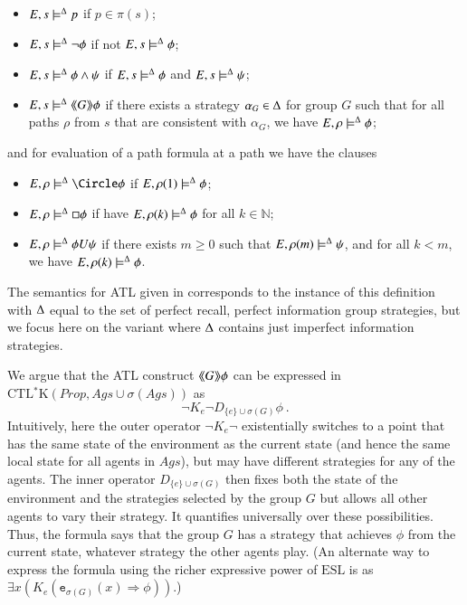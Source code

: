 \documentclass[a4wide]{article}
\newcommand{\CTLsK}{\mbox{CTL$^*$K}}
\newcommand{\ESL}{\mbox{ESL}}
\newcommand{\until}{U}
\newcommand{\Prop}{Prop}
\newcommand{\nat}{\mathbb{N}}
\theoremstyle{examplesty}
\newcommand{\strat}{\sigma}
\newcommand{\Ags}{\mathit{Ags}}
\newcommand{\atlop}[1]{\langle\hspace{-2pt}\langle #1 \rangle \hspace{-2pt}\rangle }
\newcommand{\lid}[2]{\mathtt{e}_{#1}(#2)}
\newcommand{\rimp}{\Rightarrow}
\newcommand{\Env}{E}
\newcommand{\nxt}{\Circle}
\newcommand{\always}{\Box}
\newcommand{\sgy}{\alpha}
\begin{document}
\begin{itemize}
\item $\Env,s\models^\GStrats p$ if   $p\in \pi(s)$; 
\item
$\Env,s\models^\GStrats \neg \phi$ if not $\Env,s\models^\GStrats \phi$; 

\item
$\Env,s\models^\GStrats \phi\wedge \psi$ if $\Env,s\models^\GStrats \phi$ and $\Env,s\models^\GStrats \psi$; 


\item
$\Env,s\models^\GStrats \atlop{G}\phi$ if  there exists a strategy $\sgy_G \in \GStrats$ for group $G$ 
such that for all paths $\rho$ from $s$ that are consistent with $\sgy_G$, 
we have $\Env,\rho \models^\GStrats \phi$;  
\end{itemize}
and for evaluation of a path formula at a path we have the clauses
\begin{itemize}

\item
$\Env,\rho \models^\GStrats \nxt \phi$ if   $\Env,\rho(1)\models^\GStrats \phi$;

\item
$\Env,\rho \models^\GStrats \always\phi$ if  have  $\Env,\rho(k)\models^\GStrats \phi$ for all $k \in \nat$;  

\item
$\Env,\rho\models^\GStrats \phi \until \psi$ if  there exists $m\geq 0$ such that $\Env,\rho(m)\models^\GStrats \psi$, and for all $k<m$, 
we have  $\Env,\rho(k)\models^\GStrats \phi$. 

\end{itemize}
The semantics for ATL given in \cite{ATLJACM} corresponds to the 
instance of this definition with $\Delta$ equal to the set of perfect recall, perfect information 
group 
strategies, 
but we focus here on the variant where $\Delta$ contains just imperfect information strategies. 


We argue that the ATL construct $\atlop{G}\phi$ can be expressed in 
$\CTLsK(\Prop,\Ags \cup \strat(\Ags))$ as 
$$ \neg K_{e} \neg D_{\{e\} \cup \strat(G)}  \phi~.$$ 
Intuitively, here the outer operator 
$ \neg K_{e} \neg$ 
existentially switches to a 
point that has the same state of the environment as the current state (and hence the same local state
for all agents in $\Ags$), but may have different strategies for any of the agents. 
The inner operator $D_{\{e\} \cup \strat(G)} $ then fixes both the state of the environment and
the strategies selected by the group $G$ but allows all other agents to vary their strategy. 
It quantifies universally over these possibilities. Thus, the formula says that 
the group $G$ has a strategy that achieves $\phi$ from the current state, 
whatever strategy the other agents play. 
(An alternate way to express the formula using the richer expressive 
power of $\ESL$ is as 
$\exists x(K_e(\lid{\strat(G)}{x} \rimp \phi))$.)
\end{document}
